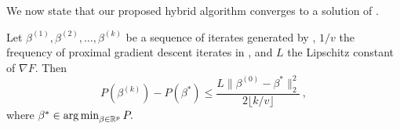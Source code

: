 We now state that our proposed hybrid algorithm converges to a solution of .

\begin{lemma}
  \label{lem:convergence}
  Let \(\beta^{(1)}, \beta^{(2)}, \dots, \beta^{(k)}\) be a sequence of
  iterates generated by , \(1/v\) the frequency of proximal gradient
  descent iterates in , and \(L\) the Lipschitz constant of
  \(\nabla F\). Then
  \[
    P(\beta^{(k)}) - P(\beta^*) \leq \frac{L \lVert \beta^{(0)} - \beta^* \rVert_2^2}{2\lfloor k/v \rfloor }\, ,
  \]
  where \(\beta^* \in \operatorname*{arg\,min}_{\beta \in \mathbb{R}^p} P.\)
\end{lemma}
